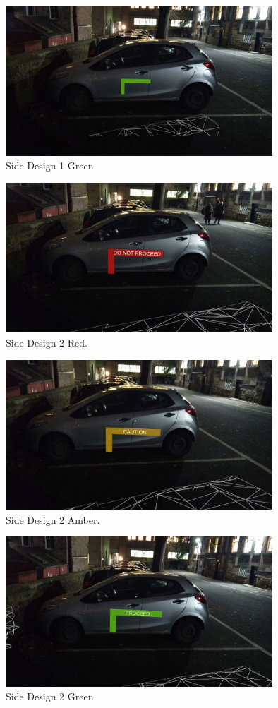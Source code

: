 \documentclass{l4proj}
\begin{document}
\begin{figure}[H]
    \centering
    \includegraphics[width=10cm]{images/003.jpg}
    \caption{Side Design 1 Green.}
    \label{fig:real_side_3}
\end{figure}

\begin{figure}[H]
    \centering
    \includegraphics[width=10cm]{images/004.jpg}
    \caption{Side Design 2 Red.}
    \label{fig:real_side_4}
\end{figure}

\begin{figure}[H]
    \centering
    \includegraphics[width=10cm]{images/005.jpg}
    \caption{Side Design 2 Amber.}
    \label{fig:real_side_5}
\end{figure}

\begin{figure}[H]
    \centering
    \includegraphics[width=10cm]{images/006.jpg}
    \caption{Side Design 2 Green.}
    \label{fig:real_side_6}
\end{figure}
\end{document}

